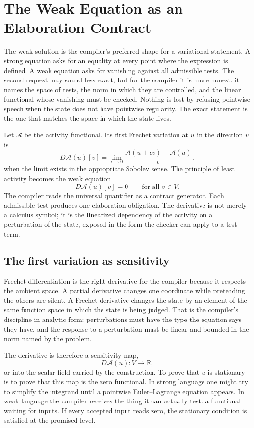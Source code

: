 \chapter[Weak Equation Contract]{The Weak Equation as an Elaboration Contract}
\label{chap:weak-equation-elaboration-contract}

The weak solution is the compiler's preferred shape for a variational statement. A strong equation asks
for an equality at every point where the expression is defined. A weak equation asks for vanishing against
all admissible tests. The second request may sound less exact, but for the compiler it is more honest: it
names the space of tests, the norm in which they are controlled, and the linear functional whose vanishing
must be checked. Nothing is lost by refusing pointwise speech when the state does not have pointwise
regularity. The exact statement is the one that matches the space in which the state lives.

Let \(\mathcal A\) be the activity functional. Its first Frechet variation at \(u\) in the direction
\(v\) is
\[
  D\mathcal A(u)[v]
    =
  \lim_{\epsilon\to 0}
    \frac{\mathcal A(u+\epsilon v)-\mathcal A(u)}{\epsilon},
\]
when the limit exists in the appropriate Sobolev sense. The principle of least activity becomes the weak
equation
\[
  D\mathcal A(u)[v] = 0
  \qquad \text{for all } v\in V .
\]
The compiler reads the universal quantifier as a contract generator. Each admissible test produces one
elaboration obligation. The derivative is not merely a calculus symbol; it is the linearized dependency of
the activity on a perturbation of the state, exposed in the form the checker can apply to a test term.

\section{The first variation as sensitivity}
\label{se:first-variation-sensitivity}

Frechet differentiation is the right derivative for the compiler because it respects the ambient space. A
partial derivative changes one coordinate while pretending the others are silent. A Frechet derivative
changes the state by an element of the same function space in which the state is being judged. That is the
compiler's discipline in analytic form: perturbations must have the type the equation says they have, and
the response to a perturbation must be linear and bounded in the norm named by the problem.

The derivative is therefore a sensitivity map,
\[
  D\mathcal A(u) : V \to \mathbb R,
\]
or into the scalar field carried by the construction. To prove that \(u\) is stationary is to prove that
this map is the zero functional. In strong language one might try to simplify the integrand until a
pointwise Euler--Lagrange equation appears. In weak language the compiler receives the thing it can
actually test: a functional waiting for inputs. If every accepted input reads zero, the stationary
condition is satisfied at the promised level.

